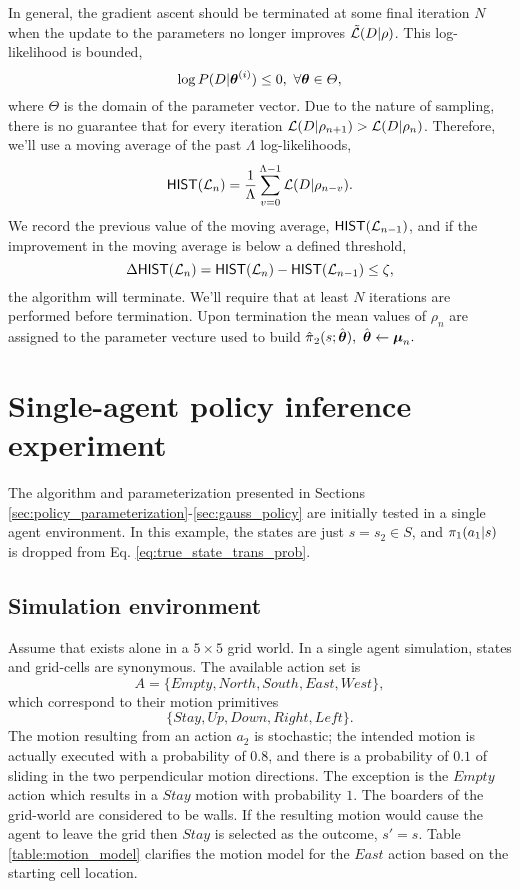    In general, the gradient ascent should be terminated at some final iteration $N$ when the update to the parameters
    no longer improves
    $\tilde{\mathcal{L}}(D|\rho)$. This log-likelihood is bounded,
    \[
    \log P(D|\boldsymbol{\mathbb{\theta}}^{(i)}) \leq 0,\  \forall \boldsymbol{\mathbb{\theta}} \in \varTheta,
    \]
    where $\varTheta$ is the domain of the parameter vector. Due to the nature of sampling, there is no guarantee that
    for every iteration $\mathcal{L}(D|\rho_{n+1})> \mathcal{L}(D|\rho_n)$. Therefore, we'll use a moving average of the past
    $\Lambda$ log-likelihoods,
    \[
    \mathsf{HIST}(\mathcal{L}_n)=\frac{1}{\Lambda}\sum_{v=0}^{\Lambda-1}\mathcal{L}(D|\rho_{n-v}).
    \]
    We record the previous value of the moving average, $\mathsf{HIST}(\mathcal{L}_{n-1})$, and if the improvement in the
    moving average is below a defined threshold,
    \[
    \Delta\mathsf{HIST}(\mathcal{L}_n) = \mathsf{HIST}(\mathcal{L}_n) - \mathsf{HIST}(\mathcal{L}_{n-1}) \leq \zeta,
    \]
    the algorithm will terminate. We'll require that at least $N$ iterations are performed before termination. Upon
    termination the mean values of $\rho_{n}$ are assigned to the parameter vecture used to build
    $\estimate{\policy{}}_{2}(s;\estimate{\paramVec}),\ \estimate{\paramVec} \leftarrow \vect{\mu}_n.$

    \section{Single-agent policy inference experiment}\label{sec:single_agent_experiment}
    The algorithm and parameterization presented in Sections \ref{sec:policy_parameterization}-\ref{sec:gauss_policy}
    are initially tested in a single agent environment. In this example, the states are just $s=s_2 \in S$, and
    $\pi_{1}(a_1|s)$ is dropped from Eq. \ref{eq:true_state_trans_prob}.

    \subsection{Simulation environment}
    Assume that  exists alone in a $5\times5$ grid world. In a single agent simulation, states and grid-cells
    are synonymous. The available action set is
    \[
    A = \{Empty, North, South, East, West\},
    \]
    which correspond to their motion primitives
    \[
    \{Stay, Up, Down, Right, Left\}.
    \]
    The motion resulting from an action $a_2$ is stochastic; the intended motion is actually executed with a probability
    of $0.8$, and there is a probability of $0.1$ of sliding in the two perpendicular motion directions. The exception
    is the $Empty$ action which results in a $Stay$ motion with probability $1$. The boarders of the grid-world are
    considered to be walls. If the resulting motion would cause the agent to leave the grid then $Stay$ is selected as
    the outcome, $s'=s$.  Table \ref{table:motion_model} clarifies the motion model for the $East$ action based on the
    starting cell location.

